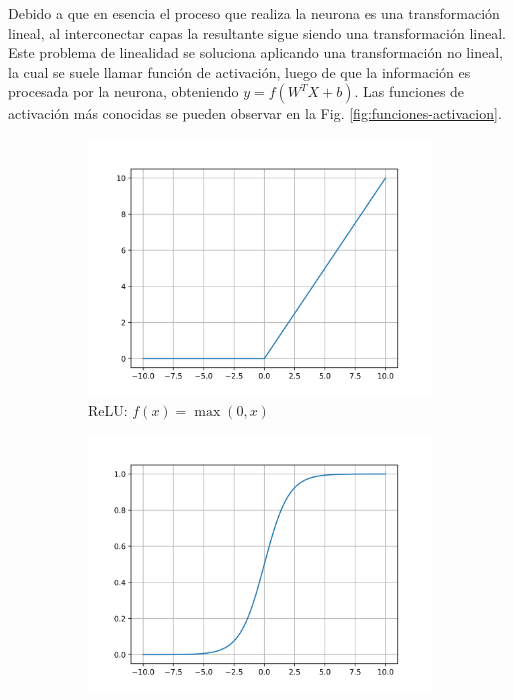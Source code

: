 Debido a que en esencia el proceso que realiza la neurona es una transformación lineal, al interconectar capas la resultante sigue siendo una transformación lineal.
Este problema de linealidad se soluciona aplicando una transformación no lineal, la cual se suele llamar función de activación,
luego de que la información es procesada por la neurona, obteniendo $y= f(W^T X + b)$. Las funciones de activación más conocidas se pueden observar en la Fig. \ref{fig:funciones-activacion}.

\begin{figure}[bth]
    \centering
    \begin{subfigure}{.45\textwidth}
        \centering
        \includegraphics[width=1\textwidth]{imgs/activacion/relu.png}
        \caption{ReLU: $f(x)=\max{(0,x)}$}
    \end{subfigure}
    \begin{subfigure}{.45\textwidth}
        \centering
        \includegraphics[width=1\textwidth]{imgs/activacion/sigmoid.png}

\end{subfigure}
\end{figure}

